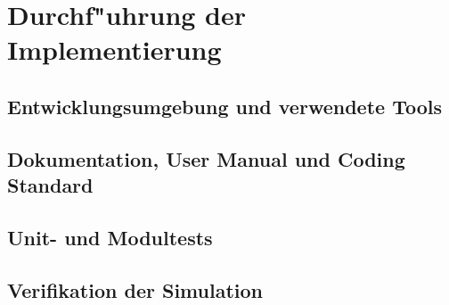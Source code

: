 \chapter{Durchf"uhrung der Implementierung}
\section{Entwicklungsumgebung und verwendete Tools}
\section{Dokumentation, User Manual und Coding Standard}
\section{Unit- und Modultests}
\section{Verifikation der Simulation}\cite{Kessler.Wintersemester201718}